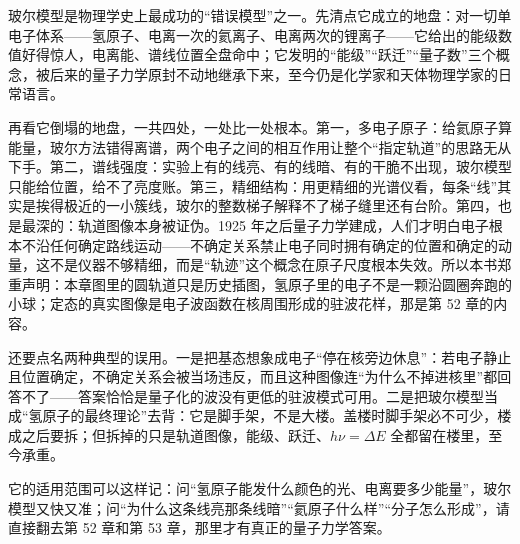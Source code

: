 
\begin{mainline}
玻尔模型是物理学史上最成功的“错误模型”之一。先清点它成立的地盘：对一切单电子体系——氢原子、电离一次的氦离子、电离两次的锂离子——它给出的能级数值好得惊人，电离能、谱线位置全盘命中；它发明的“能级”“跃迁”“量子数”三个概念，被后来的量子力学原封不动地继承下来，至今仍是化学家和天体物理学家的日常语言。

再看它倒塌的地盘，一共四处，一处比一处根本。第一，多电子原子：给氦原子算能量，玻尔方法错得离谱，两个电子之间的相互作用让整个“指定轨道”的思路无从下手。第二，谱线强度：实验上有的线亮、有的线暗、有的干脆不出现，玻尔模型只能给位置，给不了亮度账。第三，精细结构：用更精细的光谱仪看，每条“线”其实是挨得极近的一小簇线，玻尔的整数梯子解释不了梯子缝里还有台阶。第四，也是最深的：轨道图像本身被证伪。1925 年之后量子力学建成，人们才明白电子根本不沿任何确定路线运动——不确定关系禁止电子同时拥有确定的位置和确定的动量，这不是仪器不够精细，而是“轨迹”这个概念在原子尺度根本失效。所以本书郑重声明：本章图里的圆轨道只是历史插图，氢原子里的电子不是一颗沿圆圈奔跑的小球；定态的真实图像是电子波函数在核周围形成的驻波花样，那是第 52 章的内容。

还要点名两种典型的误用。一是把基态想象成电子“停在核旁边休息”：若电子静止且位置确定，不确定关系会被当场违反，而且这种图像连“为什么不掉进核里”都回答不了——答案恰恰是量子化的波没有更低的驻波模式可用。二是把玻尔模型当成“氢原子的最终理论”去背：它是脚手架，不是大楼。盖楼时脚手架必不可少，楼成之后要拆；但拆掉的只是轨道图像，能级、跃迁、\(h\nu=\Delta E\) 全都留在楼里，至今承重。

它的适用范围可以这样记：问“氢原子能发什么颜色的光、电离要多少能量”，玻尔模型又快又准；问“为什么这条线亮那条线暗”“氦原子什么样”“分子怎么形成”，请直接翻去第 52 章和第 53 章，那里才有真正的量子力学答案。
\end{mainline}


